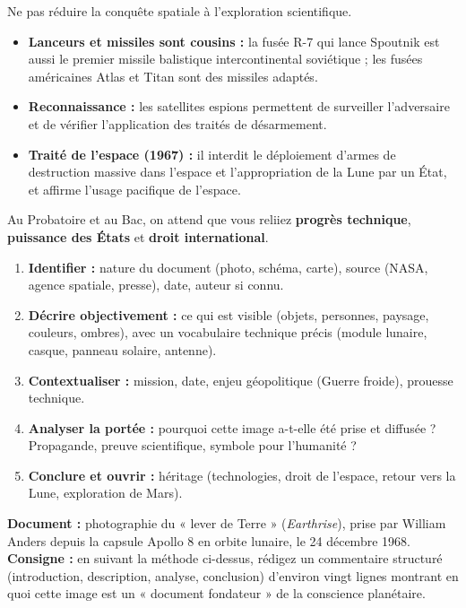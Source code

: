 \documentclass[11pt]{article}
\begin{document}
\begin{attention}[Course à l'espace = course aux armements (Guerre froide)]
Ne pas réduire la conquête spatiale à l'exploration scientifique.
\begin{itemize}
    \item \textbf{Lanceurs et missiles sont cousins :} la fusée R-7 qui lance Spoutnik est aussi le premier missile balistique intercontinental soviétique ; les fusées américaines Atlas et Titan sont des missiles adaptés.
    \item \textbf{Reconnaissance :} les satellites espions permettent de surveiller l'adversaire et de vérifier l'application des traités de désarmement.
    \item \textbf{Traité de l'espace (1967) :} il interdit le déploiement d'armes de destruction massive dans l'espace et l'appropriation de la Lune par un État, et affirme l'usage pacifique de l'espace.
\end{itemize}
Au Probatoire et au Bac, on attend que vous reliiez \textbf{progrès technique}, \textbf{puissance des États} et \textbf{droit international}.
\end{attention}

\begin{methode}
\begin{enumerate}
    \item \textbf{Identifier :} nature du document (photo, schéma, carte), source (NASA, agence spatiale, presse), date, auteur si connu.
    \item \textbf{Décrire objectivement :} ce qui est visible (objets, personnes, paysage, couleurs, ombres), avec un vocabulaire technique précis (module lunaire, casque, panneau solaire, antenne).
    \item \textbf{Contextualiser :} mission, date, enjeu géopolitique (Guerre froide), prouesse technique.
    \item \textbf{Analyser la portée :} pourquoi cette image a-t-elle été prise et diffusée ? Propagande, preuve scientifique, symbole pour l'humanité ?
    \item \textbf{Conclure et ouvrir :} héritage (technologies, droit de l'espace, retour vers la Lune, exploration de Mars).
\end{enumerate}
\end{methode}

\begin{exercice}
\textbf{Document :} photographie du « lever de Terre » (\textit{Earthrise}), prise par William Anders depuis la capsule Apollo 8 en orbite lunaire, le 24 décembre 1968.
\textbf{Consigne :} en suivant la méthode ci-dessus, rédigez un commentaire structuré (introduction, description, analyse, conclusion) d'environ vingt lignes montrant en quoi cette image est un « document fondateur » de la conscience planétaire.
\end{exercice}
\end{document}
